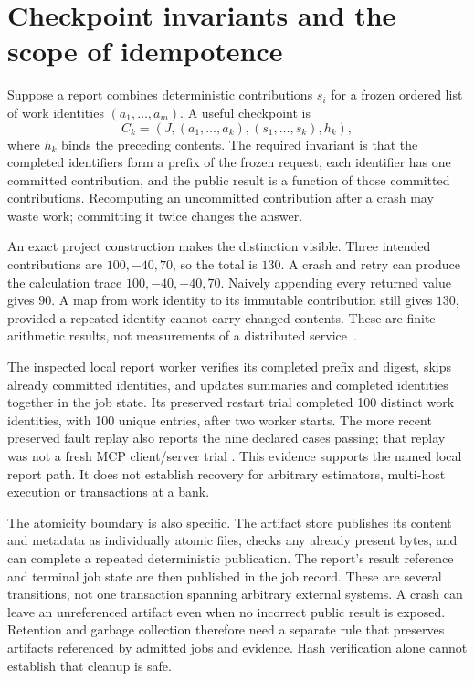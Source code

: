 \section{Checkpoint invariants and the scope of idempotence}

Suppose a report combines deterministic contributions $s_i$ for a frozen
ordered list of work identities $(a_1,\ldots,a_m)$. A useful checkpoint is
\[
 C_k=(J,(a_1,\ldots,a_k),(s_1,\ldots,s_k),h_k),
\]
where $h_k$ binds the preceding contents. The required invariant is that the
completed identifiers form a prefix of the frozen request, each identifier
has one committed contribution, and the public result is a function of those
committed contributions. Recomputing an uncommitted contribution after a
crash may waste work; committing it twice changes the answer.

An exact project construction makes the distinction visible. Three intended
contributions are $100,-40,70$, so the total is $130$. A crash and retry can
produce the calculation trace $100,-40,-40,70$. Naively appending every
returned value gives $90$. A map from work identity to its immutable
contribution still gives $130$, provided a repeated identity cannot carry
changed contents. These are finite arithmetic results, not measurements of
a distributed service~\citep{exec13_ops_exact}.

The inspected local report worker verifies its completed prefix and digest,
skips already committed identities, and updates summaries and completed
identities together in the job state. Its preserved restart trial completed
100 distinct work identities, with 100 unique entries, after two worker
starts. The more recent preserved fault replay also reports the nine declared
cases passing; that replay was not a fresh MCP client/server trial
\citep{exec13_ops_source,exec13_ops_faults}. This evidence supports the named
local report path. It does not establish recovery for arbitrary estimators,
multi-host execution or transactions at a bank.

The atomicity boundary is also specific. The artifact store publishes its
content and metadata as individually atomic files, checks any already
present bytes, and can complete a repeated deterministic publication. The
report's result reference and terminal job state are then published in the
job record. These are several transitions, not one transaction spanning
arbitrary external systems. A crash can leave an unreferenced artifact even
when no incorrect public result is exposed. Retention and garbage collection
therefore need a separate rule that preserves artifacts referenced by admitted
jobs and evidence. Hash verification alone cannot establish that cleanup is
safe.

